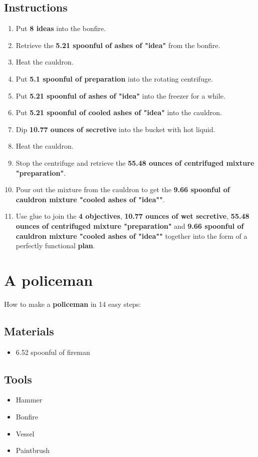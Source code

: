 \documentclass{article}
\begin{document}
\subsection{Instructions}\begin{enumerate}
\item 
Put \textbf{8 ideas} into the bonfire.
\item 
Retrieve the \textbf{5.21 spoonful of ashes of "idea"} from the bonfire.
\item 
Heat the cauldron.
\item 
Put \textbf{5.1 spoonful of preparation} into the rotating centrifuge.
\item 
Put \textbf{5.21 spoonful of ashes of "idea"} into the freezer for a while.
\item 
Put \textbf{5.21 spoonful of cooled ashes of "idea"} into the cauldron.
\item 
Dip \textbf{10.77 ounces of secretive} into the bucket with hot liquid.
\item 
Heat the cauldron.
\item 
Stop the centrifuge and retrieve the \textbf{55.48 ounces of centrifuged mixture "preparation"}.
\item 
Pour out the mixture from the cauldron to get the \textbf{9.66 spoonful of cauldron mixture "cooled ashes of "idea""}.
\item 
Use glue to join the \textbf{4 objectives}, \textbf{10.77 ounces of wet secretive}, \textbf{55.48 ounces of centrifuged mixture "preparation"} and \textbf{9.66 spoonful of cauldron mixture "cooled ashes of "idea""} together into the form of a perfectly functional \textbf{plan}.
\end{enumerate}
\newpage
\section{A policeman}How to make a \textbf{policeman} in 14 easy steps:

\subsection{Materials}\begin{itemize}
\item 
6.52 spoonful of fireman
\end{itemize}
\subsection{Tools}\begin{itemize}
\item 
Hammer
\item 
Bonfire
\item 
Vessel
\item 
Paintbrush
\end{itemize}
\end{document}
